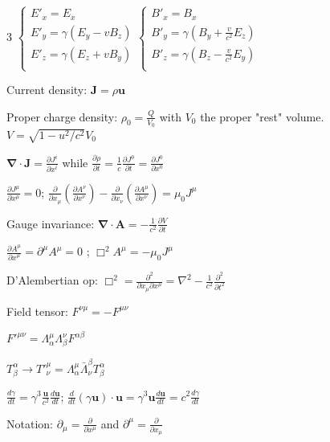 \documentclass[a4paper,twoside]{article}
\begin{document}
\begin{multicols*}{3}
\(
\begin{cases}
    E'_x = E_x \\
    E'_y = \gamma (E_y - v B_z) \\
    E'_z = \gamma (E_z + v B_y) \\
\end{cases}
\begin{cases}
    B'_x = B_x \\
    B'_y = \gamma (B_y + \frac{v}{c^2} E_z) \\
    B'_z = \gamma (B_z - \frac{v}{c^2} E_y) \\
\end{cases}
\)

Current density:
\(\bm J = \rho \bm u\)

Proper charge density:
\(\rho_0 = \frac{Q}{V_0}\)
 with \(V_0\) the proper "rest" volume.
\(V = \sqrt{1 - u^2/c^2}V_0\)

\( \bm \nabla \cdot \bm J = \frac{\partial J^{i}}{\partial x^i} \) while \(\frac{\partial \rho}{\partial t} = \frac{1}{c} \frac{\partial J^0}{\partial t } = \frac{\partial J^0}{\partial x^0}\)

\(\frac{\partial J^\mu}{\partial x^\mu} = 0\);
\(\frac{\partial}{\partial x_\mu }(\frac{\partial A^\nu}{\partial x^\nu})-\frac{\partial}{\partial x_\nu }(\frac{\partial A^\mu}{\partial x^\nu}) = \mu_0 J^\mu\)

Gauge invariance:
\(\bm \nabla \cdot \bm A = -\frac{1}{c^2} \frac{\partial V}{\partial t}\)

\(\frac{\partial A^\mu}{\partial x^\mu} = \partial^\mu A^\mu = 0\) ; \(\Box^2 A^\mu = - \mu_0 J^\mu\)

D'Alembertian op:
\(\Box^2 = \frac{\partial^2}{\partial x_\mu \partial x^\mu} = \nabla^2 -\frac{1}{c^2} \frac{\partial^2}{\partial t^2} \)    

Field tensor:
\(F^{\nu\mu} = - F^{\mu\nu}\)

\(F'^{\mu\nu} = \Lambda^\mu_\alpha \Lambda^\nu_\beta F^{\alpha\beta}\)

\(T^\alpha_\beta \to T'^\mu_\nu = \Lambda^\mu_\alpha \bar{\Lambda}_\nu^\beta T^{\alpha}_{\beta}\)

\(\frac{d \gamma}{d t} =\gamma^3 \frac{\bm u}{c^2} \frac{d \bm u}{dt}\);
\(
\frac{d}{dt} (\gamma \bm u) \cdot \bm u = \gamma^3 \bm u \frac{d \bm u}{dt} = c^2 \frac{d\gamma}{dt} \)

Notation: \(\partial_\mu = \frac{\partial}{\partial x^\mu}\) and \(\partial^\mu = \frac{\partial}{\partial x_\mu}\)



\end{multicols*}
\end{document}
